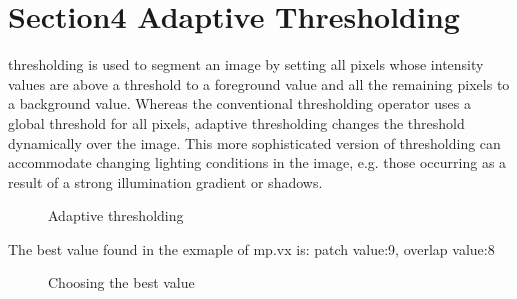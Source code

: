 \documentclass{article}
\begin{document}
\section*{Section4 Adaptive Thresholding}
thresholding is used to segment an image by setting all pixels whose intensity values are above a threshold to a foreground value and all the remaining pixels to a background value.
Whereas the conventional thresholding operator uses a global threshold for all pixels, adaptive thresholding changes the threshold dynamically over the image. This more sophisticated version of thresholding can accommodate changing lighting conditions in the image, e.g. those occurring as a result of a strong illumination gradient or shadows.
\begin{figure}[H]
\centering
{}%
%
\centering
\caption{ Adaptive thresholding}
\end{figure}
The best value found in the exmaple of mp.vx is: patch value:9, overlap value:8
\begin{figure}[H]
\centering
{}%
%
\centering
\caption{ Choosing the best value}
\end{figure}
\end{document}
